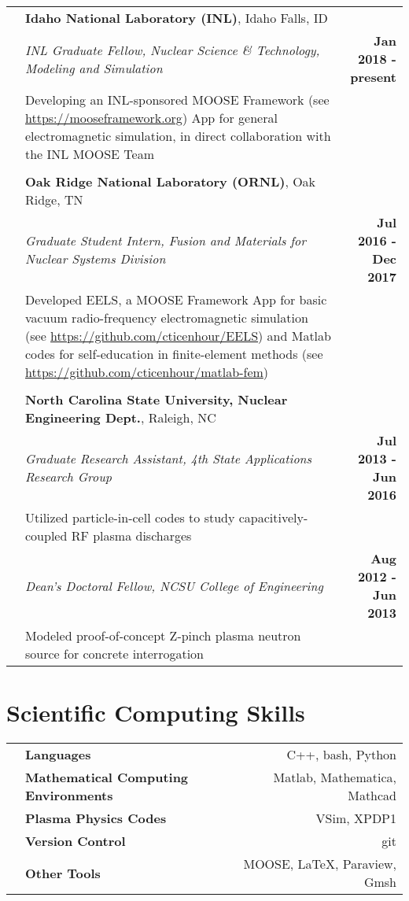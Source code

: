 \documentclass{article}
\begin{document}
	\begin{tabularx}{\textwidth}{l X r}
		\hspace{2em} & \textbf{Idaho National Laboratory (INL)}, Idaho Falls, ID & \\
					 & \textit{INL Graduate Fellow, Nuclear Science \& Technology, Modeling and Simulation} & \textbf{Jan 2018 - present} \\
					 & Developing an INL-sponsored MOOSE Framework (see \url{https://mooseframework.org}) App for general electromagnetic simulation, in direct collaboration with the INL MOOSE Team & \\
					 & & \\
					 & \textbf{Oak Ridge National Laboratory (ORNL)}, Oak Ridge, TN & \\
					 & \textit{Graduate Student Intern, Fusion and Materials for Nuclear Systems Division} & \textbf{Jul 2016 - Dec 2017} \\
					 & Developed EELS, a MOOSE Framework App for basic vacuum radio-frequency electromagnetic simulation (see \url{https://github.com/cticenhour/EELS}) and Matlab codes for self-education in finite-element methods (see \url{https://github.com/cticenhour/matlab-fem})& \\					 
					 & & \\
					 & \textbf{North Carolina State University, Nuclear Engineering Dept.}, Raleigh, NC & \\
					 & \textit{Graduate Research Assistant, 4th State Applications Research Group} & \textbf{Jul 2013 - Jun 2016} \\
					 & \hspace{1em} Utilized particle-in-cell codes to study capacitively-coupled RF plasma discharges & \\
					 & \textit{Dean's Doctoral Fellow, NCSU College of Engineering} & \textbf{Aug 2012 - Jun 2013} \\
					 & \hspace{1em} Modeled proof-of-concept Z-pinch plasma neutron source for concrete interrogation & \\
	\end{tabularx}

\section*{Scientific Computing Skills}

	\begin{tabularx}{\textwidth}{l X r}
		\hspace {2em} & \textbf{Languages} & C++, bash, Python \\
					  & \textbf{Mathematical Computing Environments} & Matlab, Mathematica, Mathcad \\
					  & \textbf{Plasma Physics Codes} & VSim, XPDP1 \\
					  & \textbf{Version Control} & git \\
					  & \textbf{Other Tools} & MOOSE, \LaTeX, Paraview, Gmsh
	\end{tabularx}
\end{document}
